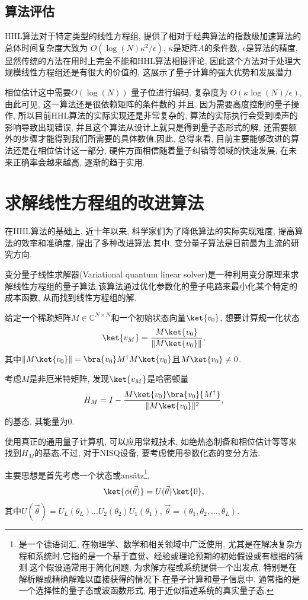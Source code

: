 \subsection{算法评估}
HHL算法对于特定类型的线性方程组, 提供了相对于经典算法的指数级加速算法的总体时间复杂度大致为 $O\left(\log(N) \kappa^2 / \epsilon\right)$, $\kappa$是矩阵$A$的条件数, $\epsilon$是算法的精度, 显然传统的方法在用时上完全不能和HHL算法相提评论, 因此这个方法对于处理大规模线性方程组还是有很大的价值的, 这展示了量子计算的强大优势和发展潜力.\par
相位估计这中需要$O(\log(N))$ 量子位进行编码, 复杂度为 $O\left(\kappa \log(N)/\epsilon\right)$, 由此可见, 这一算法还是很依赖矩阵的条件数的.并且, 因为需要高度控制的量子操作, 所以目前HHL算法的实际实现还是非常复杂的, 算法的实际执行会受到噪声的影响导致出现错误, 并且这个算法从设计上就只是得到量子态形式的解, 还需要额外的步骤才能得到我们所需要的具体数值.因此, 总得来看, 目前主要能够改进的算法还是在相位估计这一部分, 硬件方面相信随着量子纠错等领域的快速发展, 在未来正确率会越来越高, 逐渐的趋于实用.

\section{求解线性方程组的改进算法}
在HHL算法的基础上, 近十年以来, 科学家们为了降低算法的实际实现难度, 提高算法的效率和准确度, 提出了多种改进算法.其中, 变分量子算法是目前最为主流的研究方向.\par
变分量子线性求解器(Variational quantum linear solver)\cite{25}是一种利用变分原理来求解线性方程组的量子算法.该算法通过优化参数化的量子电路来最小化某个特定的成本函数, 从而找到线性方程组的解.

给定一个稀疏矩阵$M \in \mathbb{C}^{N\times N}$和一个初始状态向量$\ket{v_0}$, 想要计算规一化状态
\begin{align} 
	\ket{v_M} = \frac{M \ket{v_0}}{\|M \ket{v_0}\|},
\end{align}
其中$\|M \ket{v_0}\| = \bra{v_0}M^\dag M \ket{v_0}$且$M\ket{v_0}\ne 0$.\par 考虑$M$是非厄米特矩阵, 发现$\ket{v_M}$是哈密顿量
\begin{align}
	H_{M}=I-\frac{M\ket{v_0}\bra{v_0}{M^\dag}}{\|M \ket{v_0}\|^2},
\end{align}
的基态, 其能量为$0$.\par
使用真正的通用量子计算机, 可以应用常规技术, 如绝热态制备和相位估计等等来找到$H_{M}$的基态.不过, 对于NISQ设备, 要考虑使用参数化态的变分方法.\par
主要思想是首先考虑一个状态或ansätz\footnote[2]{是一个德语词汇, 在物理学、数学和相关领域中广泛使用, 尤其是在解决复杂方程和系统时.它指的是一个基于直觉、经验或理论预期的初始假设或有根据的猜测.这个假设通常用于简化问题, 为求解方程或系统提供一个出发点, 特别是在解析解或精确解难以直接获得的情况下.在量子计算和量子信息中, 通常指的是一个选择性的量子态或波函数形式, 用于近似描述系统的真实量子态.}, 
\begin{equation}
	\ket{\phi(\vec{\theta})}=U(\vec{\theta})\ket{0},
\end{equation}
其中$U(\vec{\theta}) = U_L(\theta_L)\dots U_2(\theta_2)U_1(\theta_1)$, $\vec{\theta}=(\theta_1,\theta_2,...,\theta_L)$.


